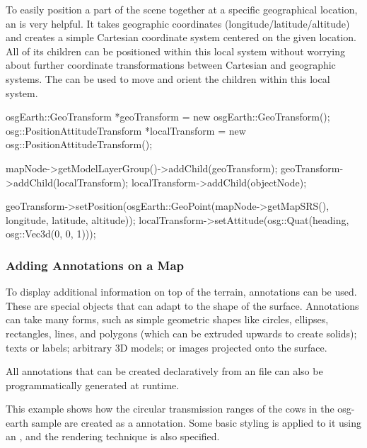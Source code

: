 To easily position a part of the scene together at a specific geographical
location, an  is very helpful. It takes
geographic coordinates (longitude/latitude/altitude) and creates a simple
Cartesian coordinate system centered on the given location. All of its children
can be positioned within this local system without worrying about further
coordinate transformations between Cartesian and geographic systems. The
 can be used to move and orient the
children within this local system.

\begin{cpp}
osgEarth::GeoTransform *geoTransform = new osgEarth::GeoTransform();
osg::PositionAttitudeTransform *localTransform = new osg::PositionAttitudeTransform();

mapNode->getModelLayerGroup()->addChild(geoTransform);
geoTransform->addChild(localTransform);
localTransform->addChild(objectNode);

geoTransform->setPosition(osgEarth::GeoPoint(mapNode->getMapSRS(), longitude, latitude, altitude));
localTransform->setAttitude(osg::Quat(heading, osg::Vec3d(0, 0, 1)));
\end{cpp}

\subsubsection{Adding Annotations on a Map}
\label{sec:graphics:osgearth-adding-annotations}

To display additional information on top of the terrain, annotations can be
used. These are special objects that can adapt to the shape of the surface.
Annotations can take many forms, such as simple geometric shapes like circles,
ellipses, rectangles, lines, and polygons (which can be extruded upwards to
create solids); texts or labels; arbitrary 3D models; or images projected onto
the surface.

All annotations that can be created declaratively from an  file can also
be programmatically generated at runtime.

This example shows how the circular transmission ranges of the cows in the
osg-earth sample are created as a 
annotation. Some basic styling is applied to it using an
, and the rendering technique is also specified.

